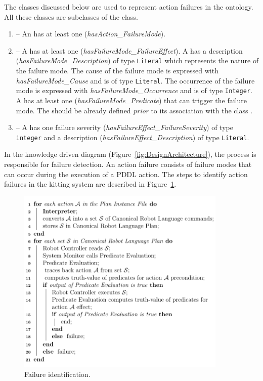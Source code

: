 The classes discussed below are used to represent action failures in the  
ontology. All these classes are subclasses of the  class.
\begin{enumerate}
\item {} -- An  has at least one  
(\emph{hasAction\_FailureMode}).
\item {} -- A  has at least one  
(\emph{hasFailureMode\_FailureEffect}). A  has a description 
(\emph{hasFailureMode\_Description}) of type \texttt{Literal} which represents the 
nature of the failure mode. The cause of the failure mode is expressed with 
\emph{hasFailureMode\_Cause} and is of type \texttt{Literal}. The occurrence of 
the failure mode is expressed with \emph{hasFailureMode\_Occurrence} and is of 
type \texttt{Integer}. A  has at least one  
(\emph{hasFailureMode\_Predicate}) that can trigger the failure mode. The  
should be already defined \textit{prior} to its association with the class .
\item {} -- A  has one failure severity 
(\emph{hasFailureEffect\_FailureSeverity}) of type \texttt{integer} and a 
description (\emph{hasFailureEffect\_Description}) of type \texttt{Literal}.
\end{enumerate}

In the knowledge driven diagram (Figure~\ref{fig:DesignArchitecture}), the 
 process is responsible for failure detection. 
An action failure consists of failure modes that can occur during the execution of a 
PDDL action. The steps to identify action failures in the kitting system are 
described in Figure~\ref{fig:algo}.

\begin{figure}[h!t!]
  \centering
  \includegraphics[width=10cm]{images/algorithm.pdf}
  \caption{Failure identification.}
  \label{fig:algo}
\end{figure}

